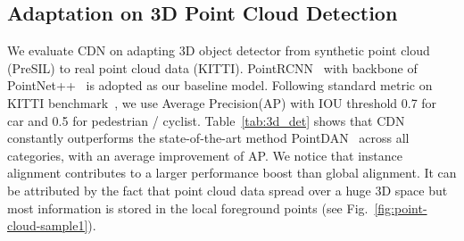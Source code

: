 \documentclass[runningheads]{llncs}
\begin{document}
\vspace{-10pt}

\subsection{Adaptation on 3D Point Cloud  Detection}


We evaluate CDN on adapting 3D object detector from synthetic point cloud (PreSIL) to real point cloud data (KITTI).
PointRCNN~\cite{shi2019pointrcnn} with backbone of PointNet++~\cite{qi2017pointnet++} is adopted as our baseline model.
Following standard metric on KITTI benchmark~\cite{shi2019pointrcnn}, we use Average Precision(AP) with IOU threshold 0.7 for car and 0.5 for pedestrian / cyclist.
Table~\ref{tab:3d_det} shows that CDN constantly outperforms the state-of-the-art method PointDAN~\cite{qin2019pointdan} across all categories, with an average improvement of  AP.
We notice that instance alignment contributes to a larger performance boost than global alignment.
It can be attributed by the fact that point cloud data spread over a huge 3D space but most information is stored in the local foreground points (see Fig.~\ref{fig:point-cloud-sample1}).
\vspace{8pt}
\end{document}
